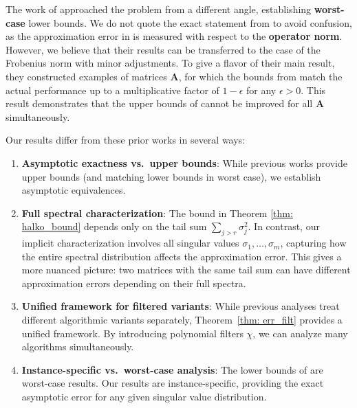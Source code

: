 \documentclass[conference]{IEEEtran}
\newcommand{\bA}{\mathbf{A}}
\begin{document}
The work of \cite{witten2015randomized} approached the problem from a different angle, establishing {\bf worst-case} lower bounds. We do not quote the exact statement from \cite{witten2015randomized} to avoid confusion, as the approximation error in \cite{witten2015randomized} is measured with respect to the {\bf operator norm}. However, we believe that their results can be transferred to the case of the Frobenius norm with minor adjustments.  To give a flavor of their main result, they constructed examples of matrices $\bA$, for which the bounds from \cite{halko2011finding}  match the actual performance up to a multiplicative factor of $1 - \epsilon$ for any $\epsilon > 0$. This result demonstrates that the upper bounds of \cite{halko2011finding} cannot be improved for all $\bA$ simultaneously. 

Our results differ from these prior works in several ways:

\begin{enumerate}
\item {\bf Asymptotic exactness vs.\ upper bounds}: While previous works provide upper bounds (and matching lower bounds in worst case), we establish asymptotic equivalences. 

\item {\bf Full spectral characterization}: The bound in Theorem \ref{thm: halko_bound} depends only on the tail sum $\sum_{j>r} \sigma_j^2$. In contrast, our implicit characterization involves all singular values $\sigma_1, \ldots, \sigma_m$, capturing how the entire spectral distribution affects the approximation error. This gives a more nuanced picture: two matrices with the same tail sum can have different approximation errors depending on their full spectra.

\item {\bf Unified framework for filtered variants}: While previous analyses treat different algorithmic variants separately, Theorem~\ref{thm: err_filt} provides a unified framework. By introducing polynomial filters $\chi$, we can analyze many algorithms simultaneously.

\item {\bf Instance-specific vs.\ worst-case analysis}: The lower bounds of \cite{witten2015randomized} are worst-case results.  Our results are instance-specific, providing the exact asymptotic error for any given singular value distribution. 
\end{enumerate}

\end{document}
